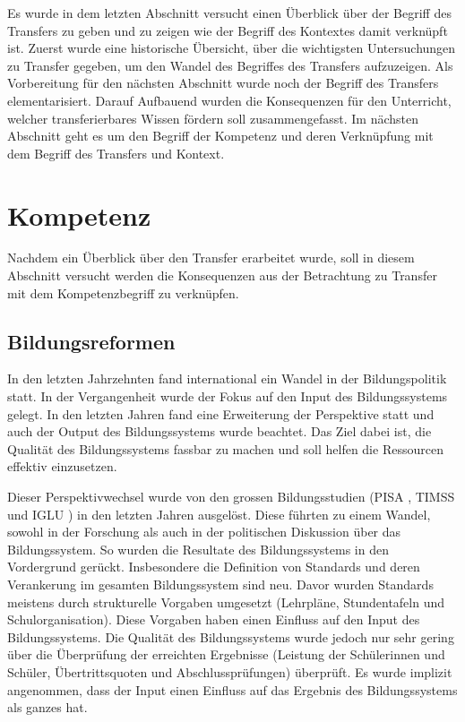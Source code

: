 Es wurde in dem letzten Abschnitt versucht einen Überblick über der Begriff des Transfers zu geben und zu zeigen wie der Begriff des Kontextes damit verknüpft ist. Zuerst wurde eine historische Übersicht, über die wichtigsten Untersuchungen zu Transfer gegeben, um den Wandel des Begriffes des Transfers aufzuzeigen.  Als Vorbereitung für den nächsten Abschnitt wurde noch der Begriff des Transfers elementarisiert. Darauf Aufbauend wurden die Konsequenzen für den Unterricht, welcher transferierbares Wissen fördern soll zusammengefasst. Im nächsten Abschnitt geht es um den Begriff der Kompetenz und deren Verknüpfung mit dem Begriff des Transfers und Kontext.


\section{Kompetenz}

Nachdem ein Überblick über den Transfer erarbeitet wurde, soll in diesem Abschnitt versucht werden die Konsequenzen aus der Betrachtung zu Transfer mit dem Kompetenzbegriff zu verknüpfen.

\subsection{Bildungsreformen}
In den letzten Jahrzehnten fand international ein Wandel in der Bildungspolitik statt. In der Vergangenheit wurde der Fokus auf den Input des Bildungssystems gelegt. In den letzten Jahren fand eine Erweiterung der Perspektive statt und auch der Output des Bildungssystems wurde beachtet. Das Ziel dabei ist, die Qualität des Bildungssystems fassbar zu machen und soll helfen die Ressourcen effektiv einzusetzen.

Dieser Perspektivwechsel wurde von den grossen Bildungsstudien (PISA \citep{PISA-KonsortiumDeuschland2004}, TIMSS \citep{Martin2003} und IGLU \citep{Bos2003}) in den letzten Jahren ausgelöst. Diese führten zu einem Wandel, sowohl in der Forschung als auch in der politischen Diskussion über das Bildungssystem. So wurden die Resultate des Bildungssystems in den Vordergrund gerückt. Insbesondere die Definition von Standards und deren Verankerung im gesamten Bildungssystem sind neu. Davor wurden Standards meistens durch strukturelle Vorgaben umgesetzt (Lehrpläne, Stundentafeln und Schulorganisation). Diese Vorgaben haben einen Einfluss auf den Input des Bildungssystems. Die Qualität des Bildungssystems wurde jedoch nur sehr gering über die Überprüfung der erreichten Ergebnisse (Leistung der Schülerinnen und Schüler, Übertrittsquoten und Abschlussprüfungen) überprüft. Es wurde implizit angenommen, dass der Input einen Einfluss auf das Ergebnis des Bildungssystems als ganzes hat. 

